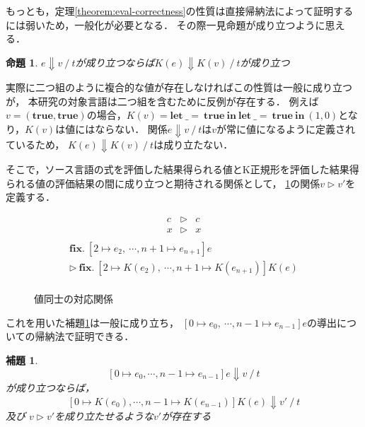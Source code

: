 \documentclass[T]{compsoft}
\newcommand{\keyword}[1]{\mathbf{#1}}
\newcommand{\TRUE}{\keyword{true}}
\newcommand{\LET}{\keyword{let}}
\newcommand{\FIX}{\keyword{fix}}
\newcommand{\IN}{\keyword{in}}
\newcommand{\theoremname}{定理}
\newcommand{\lemmaname}{補題}
\newtheorem{lemma}{\lemmaname}
\newcommand{\propositioname}{命題}
\newtheorem{proposition}{\propositioname}
\begin{document}
もっとも，\theoremname\ref{theorem:eval-correctness}の性質は直接帰納法によって証明するには弱いため，一般化が必要となる．
その際一見\propositioname\label{proposition:wrong-lemma}が成り立つように思える．
\begin{proposition}\label{proposition:wrong-lemma}
	$e\Downarrow v~/~t$が成り立つならば$K(e)\Downarrow K(v)~/~t$が成り立つ
\end{proposition}
実際に二つ組のように複合的な値が存在しなければこの性質は一般に成り立つが，
本研究の対象言語は二つ組を含むために反例が存在する．
例えば$v=(\TRUE,\TRUE)$の場合，$K(v)=\LET~\_=~\TRUE~\IN~\LET~\_=~\TRUE~\IN~(1,0)$となり，$K(v)$は値にはならない．
関係$e \Downarrow v~/~t$は$v$が常に値になるように定義されているため，
$K(e)\Downarrow K(v)~/~t$は成り立たない．

そこで，ソース言語の式を評価した結果得られる値とK正規形を評価した結果得られる値の評価結果の間に成り立つと期待される関係として，
\figurename\ref{eqn:knormal-value-relation}の関係$v \rhd v'$を定義する．
\begin{figure}
	\[\begin{array}{rcl}
		c & \rhd & c \\
		x & \rhd & x \\
	\end{array}\]
	\[\begin{array}{l}
		\FIX.~[2\mapsto e_2,~\cdots , n+1\mapsto e_{n+1}]e\\
		\rhd~\FIX.~[2\mapsto K(e_2),~\cdots , n+1\mapsto K(e_{n+1})]K(e) \\
	\end{array}\]
	\begin{prooftree}
	\end{prooftree}
	\caption{値同士の対応関係}
	\label{eqn:knormal-value-relation}
\end{figure}
これを用いた\lemmaname\ref{lemma:eval-correctness}は一般に成り立ち，
$[0\mapsto e_0,~\cdots , n-1\mapsto e_{n-1}]e$の導出についての帰納法で証明できる．
\begin{lemma}\label{lemma:eval-correctness}
	\[[0\mapsto e_0,\cdots , n-1\mapsto e_{n-1}]e\Downarrow v~/~t\]
	が成り立つならば，
	\[[0\mapsto K(e_0),\cdots , n-1\mapsto K(e_{n-1})]K(e)\Downarrow v'~/~t\]及び
	$v\rhd v'$を成り立たせるような$v'$が存在する
\end{lemma}
\end{document}
